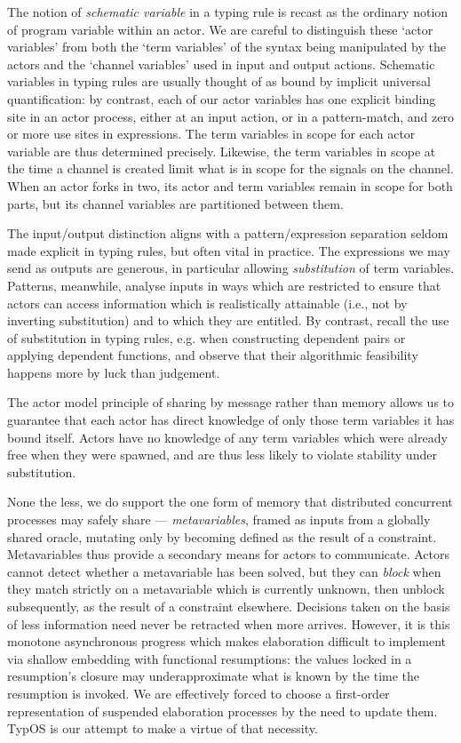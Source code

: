 \documentclass{easychair}
\newcommand{\TypOS}{TypOS\xspace}
\begin{document}
The notion of \emph{schematic variable} in a typing rule is recast as
the ordinary notion of program variable within an actor. We are
careful to distinguish these `actor variables' from both the `term
variables' of the syntax being manipulated by the actors and the
`channel variables' used in input and output actions. Schematic
variables in typing rules are usually thought of as bound by implicit
universal quantification: by contrast, each of our actor variables has
one explicit binding site in an actor process, either at an input
action, or in a pattern-match, and zero or more use sites in
expressions. The term variables in scope for each actor variable are
thus determined precisely. Likewise, the term variables in scope at
the time a channel is created limit what is in scope for the signals
on the channel. When an actor forks in two, its actor and term variables
remain in scope for both parts, but its channel variables are partitioned
between them.

The input/output distinction aligns with a pattern/expression
separation seldom made explicit in typing rules, but often vital in
practice. The expressions we may send as outputs are generous, in
particular allowing \emph{substitution} of term variables. Patterns,
meanwhile, analyse inputs in ways which are restricted to ensure that
actors can access information which is realistically attainable (i.e.,
not by inverting substitution) and to which they are entitled. By
contrast, recall the use of substitution in typing rules, e.g. when
constructing dependent pairs or applying dependent functions, and
observe that their algorithmic feasibility happens more by luck than
judgement.

The actor model principle of sharing by message rather than memory
allows us to guarantee that each actor has direct knowledge of only
those term variables it has bound itself. Actors have no knowledge of
any term variables which were already free when they were spawned, and
are thus less likely to violate stability under substitution.

None the less, we do support the one form of memory that distributed
concurrent processes may safely share --- \emph{metavariables}, framed
as inputs from a globally shared oracle, mutating only by becoming
defined as the result of a constraint. Metavariables thus provide a
secondary means for actors to communicate. Actors cannot detect
whether a metavariable has been solved, but they can \emph{block} when
they match strictly on a metavariable which is currently unknown, then
unblock subsequently, as the result of a constraint
elsewhere. Decisions taken on the basis of less information need
never be retracted when more arrives. However, it is
this monotone asynchronous progress which makes elaboration
difficult to implement via shallow embedding with functional
resumptions: the values locked in a resumption's closure may
underapproximate what is known by the time the resumption is invoked.
We are effectively forced to choose a first-order representation of
suspended elaboration processes by the need to update them. \TypOS{}
is our attempt to make a virtue of that necessity.
\end{document}
